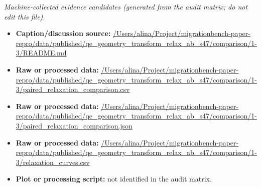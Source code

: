 \emph{Machine-collected evidence candidates (generated from the audit matrix; do not edit this file).}
\begin{itemize}[leftmargin=1.4em,noitemsep]
\item \textbf{Caption/discussion source:} \url{/Users/alina/Project/migrationbench-paper-repro/data/published/qe_geometry_transform_relax_ab_s47/comparison/1-3/README.md}
\item \textbf{Raw or processed data:} \url{/Users/alina/Project/migrationbench-paper-repro/data/published/qe_geometry_transform_relax_ab_s47/comparison/1-3/paired_relaxation_comparison.csv}
\item \textbf{Raw or processed data:} \url{/Users/alina/Project/migrationbench-paper-repro/data/published/qe_geometry_transform_relax_ab_s47/comparison/1-3/paired_relaxation_comparison.json}
\item \textbf{Raw or processed data:} \url{/Users/alina/Project/migrationbench-paper-repro/data/published/qe_geometry_transform_relax_ab_s47/comparison/1-3/relaxation_curves.csv}
\item \textbf{Plot or processing script:} not identified in the audit matrix.
\end{itemize}
